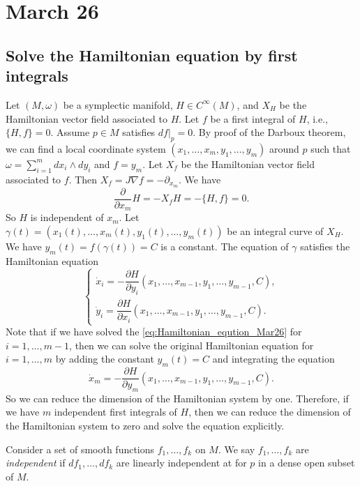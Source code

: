 \section{March 26}


\subsection{Solve the Hamiltonian equation by first integrals}

  Let $(M, \omega)$ be a symplectic manifold, $H \in C^\infty(M)$, and $X_H$ be the Hamiltonian vector field associated to $H$. 
  Let $f$ be a first integral of $H$, i.e., $\{H, f\} = 0$. 
  Assume $p \in M$ satisfies $df|_{p} = 0$.
  By proof of the Darboux theorem, we can find a local coordinate system $(x_1, \ldots, x_m, y_1, \ldots, y_m)$ around $p$ such that $\omega = \sum_{i=1}^m dx_i \wedge dy_i$ and $f = y_m$.
  Let $X_f$ be the Hamiltonian vector field associated to $f$. 
  Then $X_f = J \nabla f = - \partial_{x_m}$.
  We have 
  \[ \frac{\partial}{\partial x_m} H = - X_f H = - \{H, f\} = 0. \]
  So $H$ is independent of $x_m$.
  Let $\gamma(t) = (x_1(t), \ldots, x_m(t), y_1(t), \ldots, y_m(t))$ be an integral curve of $X_H$.
  We have $y_m(t) = f(\gamma(t)) = C$ is a constant.
  The equation of $\gamma$ satisfies the Hamiltonian equation
  \begin{equation}\label{eq:Hamiltonian_eqution_Mar26}
    \begin{cases}
      \dot{x}_i = - \dfrac{\partial H}{\partial y_i}(x_1, \ldots, x_{m-1}, y_1, \ldots, y_{m-1}, C), \\
      \dot{y}_i = \dfrac{\partial H}{\partial x_i}(x_1, \ldots, x_{m-1}, y_1, \ldots, y_{m-1}, C).
    \end{cases}
  \end{equation} 
  Note that if we have solved the \cref{eq:Hamiltonian_eqution_Mar26} for $i = 1, \ldots, m-1$, then we can solve the original Hamiltonian equation for $i = 1, \ldots, m$ by adding the constant $y_m(t) = C$ and integrating the equation 
  \[ \dot{x}_m = - \dfrac{\partial H}{\partial y_m}(x_1, \ldots, x_{m-1}, y_1, \ldots, y_{m-1}, C). \]
  So we can reduce the dimension of the Hamiltonian system by one.
  Therefore, if we have $m$ independent first integrals of $H$, then we can reduce the dimension of the Hamiltonian system to zero and solve the equation explicitly.

  \begin{definition}
    Consider a set of smooth functions $f_1, \ldots, f_k$ on $M$.
    We say $f_1, \ldots, f_k$ are \emph{independent} if $df_1, \ldots, df_k$ are linearly independent at for $p$ in a dense open subset of $M$.
  \end{definition}


